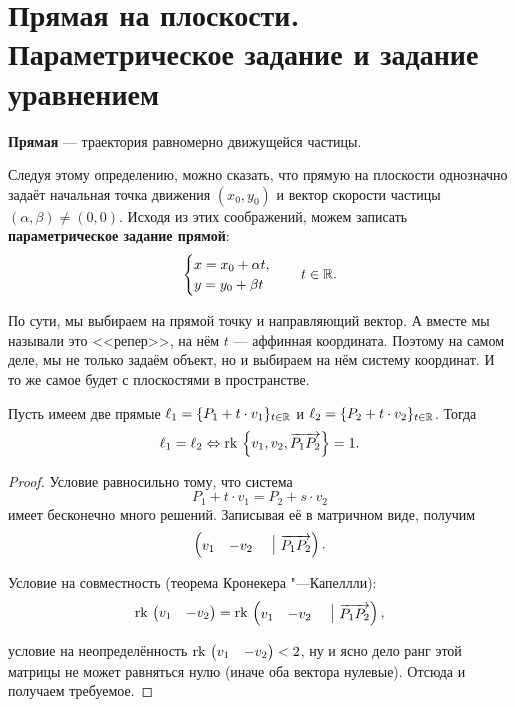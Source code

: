 \section{Прямая на плоскости. Параметрическое задание и задание уравнением}

\begin{definition}
    \textbf{Прямая} --- траектория равномерно движущейся частицы.
\end{definition}

Следуя этому определению, можно сказать, что прямую на плоскости однозначно задаёт начальная точка движения $(x_0, y_0)$ и вектор скорости частицы $(\alpha, \beta) \ne (0, 0)$. Исходя из этих соображений, можем записать \textbf{параметрическое задание прямой}:
$$
\begin{cases}
    x = x_0 + \alpha t,\\
    y = y_0 + \beta t
\end{cases}\quad t \in \mathbb{R}.
$$

По сути, мы выбираем на прямой точку и направляющий вектор. А вместе мы называли это <<репер>>, на нём $t$ --- аффинная координата. Поэтому на самом деле, мы не только задаём объект, но и выбираем на нём систему координат. И то же самое будет с плоскостями в пространстве.

\begin{statement}
    Пусть имеем две прямые $\ell_1 = \{P_1 + t\cdot v_1\}_{t \in \mathbb{R}}$ и $\ell_2 = \{P_2 + t\cdot v_2\}_{t \in \mathbb{R}}$. Тогда
    $$\ell_1 = \ell_2 \Leftrightarrow \mathrm{rk}\,\left\{v_1, v_2, \overrightarrow{P_1P_2}\right\} = 1.$$
\end{statement}

\begin{proof}
    Условие равносильно тому, что система
    $$P_1 + t \cdot v_1 = P_2 + s \cdot v_2$$
    имеет бесконечно много решений. Записывая её в матричном виде, получим
    $$
    \begin{pmatrix}
        v_1 & -v_2 & \bord & \overrightarrow{P_1P_2}
    \end{pmatrix}.
    $$

    Условие на совместность (теорема Кронекера "---Капеллли):
    $$\rk
    \begin{pmatrix}
        v_1 & -v_2
    \end{pmatrix} = \rk
    \begin{pmatrix}
        v_1 & -v_2 & \bord & \overrightarrow{P_1P_2}
    \end{pmatrix},
    $$

    условие на неопределённость
    $\mathrm{rk}\,
    \begin{pmatrix}
        v_1 & -v_2
    \end{pmatrix} < 2
    $,
    ну и ясно дело ранг этой матрицы не может равняться нулю (иначе оба вектора нулевые). Отсюда и получаем требуемое.
\end{proof}

